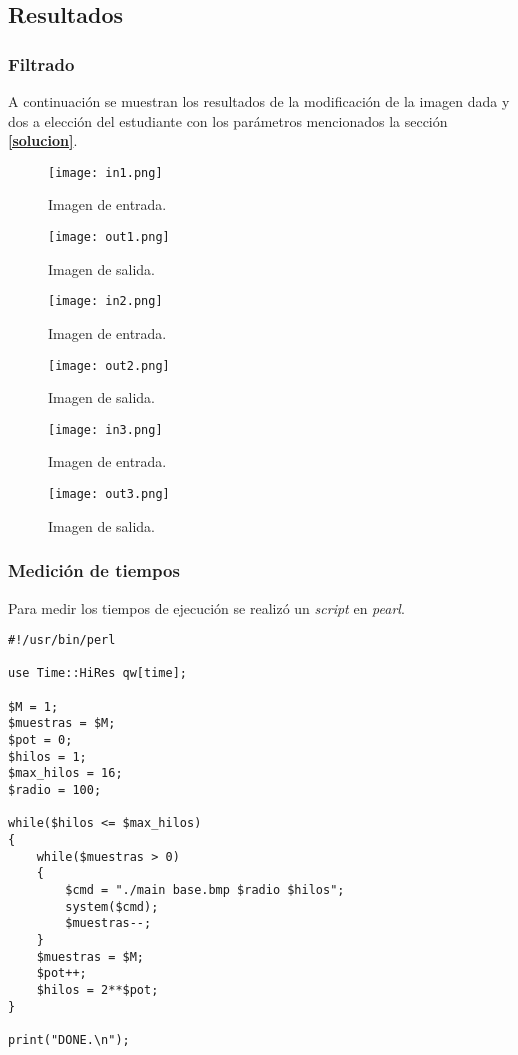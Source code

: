 \documentclass[12pt,a4paper]{article}
\begin{document}
\subsection{Resultados}
\label{resultados}

\subsubsection{Filtrado}
\label{filtrado}
A continuación se muestran los resultados de la modificación de la imagen dada
y dos a elección del estudiante con los parámetros mencionados la
sección \textbf{\ref{solucion}}.

\begin{figure}[H]
  \centering
  \texttt{[image: in1.png]}
  \caption{Imagen de entrada.}
  \label{input}
\end{figure}

\begin{figure}[H]
  \centering
  \texttt{[image: out1.png]}
  \caption{Imagen de salida.}
  \label{output}
\end{figure}

\begin{figure}[H]
  \centering
  \texttt{[image: in2.png]}
  \caption{Imagen de entrada.}
  \label{input1}
\end{figure}

\begin{figure}[H]
  \centering
  \texttt{[image: out2.png]}
  \caption{Imagen de salida.}
  \label{output1}
\end{figure}

\begin{figure}[H]
  \centering
  \texttt{[image: in3.png]}
  \caption{Imagen de entrada.}
  \label{input2}
\end{figure}

\begin{figure}[H]
  \centering
  \texttt{[image: out3.png]}
  \caption{Imagen de salida.}
  \label{output2}
\end{figure}

\subsubsection{Medición de tiempos}
\label{tiempos}
Para medir los tiempos de ejecución se realizó un \emph{script} en \emph{pearl}.

\begin{lstlisting}[caption={\emph{Script} de ejecución.}, label={script}, language=mperl]
#!/usr/bin/perl

use Time::HiRes qw[time];

$M = 1;
$muestras = $M;
$pot = 0;
$hilos = 1;
$max_hilos = 16;
$radio = 100;

while($hilos <= $max_hilos)
{
	while($muestras > 0)
	{
		$cmd = "./main base.bmp $radio $hilos";
		system($cmd);
		$muestras--;
	}
	$muestras = $M;
	$pot++;
    $hilos = 2**$pot;
}

print("DONE.\n");
\end{lstlisting}
\end{document}
